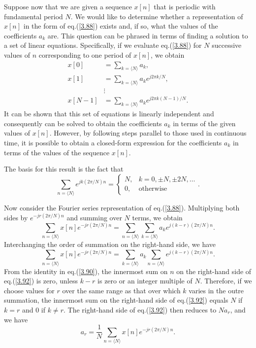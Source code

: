 \documentclass[a4paper,twoside]{book}
\begin{document}
Suppose now that we are given a sequence $x[n]$ that is periodic with fundamental period $N$. We would like to determine whether a representation of $x[n]$ in the form of eq.\;(\ref{3.88}) exists and, if so, what the values of the coefficients $a_k$ are. This question can be phrased in terms of finding a solution to a set of linear equations. Specifically, if we evaluate eq.\;(\ref{3.88}) for $N$ successive values of $n$ corresponding to one period of $x[n]$, we obtain
\begin{equation}
    \begin{aligned}x[0]& =\sum_{k=\langle N\rangle}a_{k},\\x[1]& =\sum_{k=\langle N\rangle}a_{k}e^{j2\pi k/N},\\&\vdots\\x[N-1]& =\sum_{k=\langle N\rangle}a_{k}e^{j2\pi k(N-1)/N}.\end{aligned}
    \label{3.89}
\end{equation}
It can be shown that this set of equations is linearly independent and consequently can be solved to obtain the coefficients $a_k$ in terms of the given values of $x[n]$. However, by following steps parallel to those used in continuous time, it is possible to obtain a closed-form expression for the coefficients $a_k$ in terms of the values of the sequence $x[n]$.

The basis for this result is the fact that
\begin{equation}
    \left.\sum_{n=\langle N\rangle}e^{jk(2\pi/N)n}=\left\{\begin{array}{ll}N,&k=0,\pm N,\pm2N,\ldots\\0,&\text{otherwise}\end{array}\right.\right..
    \label{3.90}
\end{equation}

Now consider the Fourier series representation of eq.\;(\ref{3.88}). Multiplying both sides by $e^{-jr(2\pi/N)n}$ and summing over $N$ terms, we obtain
\begin{equation}
    \sum_{n=\langle N\rangle}x[n]e^{-jr(2\pi/N)n}=\sum_{n=\langle N\rangle}\sum_{k=\langle N\rangle}a_ke^{j(k-r)(2\pi/N)n}.
    \label{3.91}
\end{equation}
Interchanging the order of summation on the right-hand side, we have
\begin{equation}
    \sum_{n=\langle N\rangle}x[n]e^{-jr(2\pi/N)n}=\sum_{k=\langle N\rangle}a_k\sum_{n=\langle N\rangle}e^{j(k-r)(2\pi/N)n}.
    \label{3.92}
\end{equation}
From the identity in eq.\;(\ref{3.90}), the innermost sum on $n$ on the right-hand side of eq.\;(\ref{3.92}) is zero, unless $k-r$ is zero or an integer multiple of $N$. Therefore, if we choose values for $r$ over the same range as that over which $k$ varies in the outre summation, the innermost sum on the right-hand side of eq.\;(\ref{3.92}) equals $N$ if $k=r$ and 0 if $k\ne r$. The right-hand side of eq.\;(\ref{3.92}) then reduces to $Na_r$, and we have
\begin{equation}
    a_r = \frac{1}{N}\sum_{n=\langle N\rangle}x[n]e^{-jr(2\pi/N)n}.
    \label{3.93}
\end{equation}
\end{document}
